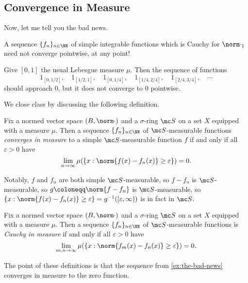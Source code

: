 \documentclass[../notes.tex]{subfiles}
\begin{document}
\subsection{Convergence in Measure}
Now, let me tell you the bad news.
\begin{warn}
	A sequence $\{f_n\}_{n\in\NN}$ of simple integrable functions which is Cauchy for $\norm\cdot_1$ need not converge pointwise, at any point!
\end{warn}
\begin{example} \label{ex:the-bad-news}
	Give $[0,1]$ the usual Lebesgue measure $\mu$. Then the sequence of functions
	\[1_{[0,1/2]},\quad1_{[1/2,1]},\quad1_{[0,1/4]},\quad1_{[1/4,2/4]},\quad1_{[2/4,3/4]},\quad\cdots\]
	should approach $0$, but it does not converge to $0$ pointwise.
\end{example}
We close class by discussing the following definition.
\begin{definition}
	Fix a normed vector space $(B,\norm\cdot)$ and a $\sigma$-ring $\mc S$ on a set $X$ equipped with a measure $\mu$. Then a sequence $\{f_n\}_{n\in\NN}$ of $\mc S$-measurable functions \textit{converges in measure} to a simple $\mc S$-measurable function $f$ if and only if all $\varepsilon>0$ have
	\[\lim_{n\to\infty}\mu(\{x:\norm{f(x)-f_n(x)}\ge\varepsilon\})=0.\]
\end{definition}
\begin{remark}
	Notably, $f$ and $f_n$ are both simple $\mc S$-measurable, so $f-f_n$ is $\mc S$-measurable, so $g\coloneqq\norm{f-f_n}$ is $\mc S$-measurable, so $\{x:\norm{f(x)-f_n(x)}\ge\varepsilon\}=g^{-1}([\varepsilon,\infty))$ is in fact in $\mc S$.
\end{remark}
\begin{definition}
	Fix a normed vector space $(B,\norm\cdot)$ and a $\sigma$-ring $\mc S$ on a set $X$ equipped with a measure $\mu$. Then a sequence $\{f_n\}_{n\in\NN}$ of $\mc S$-measurable functions is \textit{Cauchy in measure} if and only if all $\varepsilon>0$ have
	\[\lim_{m,n\to\infty}\mu(\{x:\norm{f_m(x)-f_n(x)}\ge\varepsilon\})=0.\]
\end{definition}
The point of these definitions is that the sequence from \autoref{ex:the-bad-news} converges in measure to the zero function.
\end{document}
